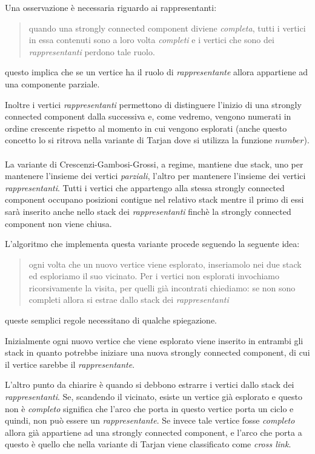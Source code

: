 Una osservazione \`e necessaria riguardo ai rappresentanti:
\begin{quotation}
  quando una strongly connected component diviene \emph{completa},
  tutti i vertici in essa contenuti sono a loro volta \emph{completi}
  e i vertici che sono dei \emph{rappresentanti} perdono tale ruolo.
\end{quotation}
questo implica che se un vertice ha il ruolo di \emph{rappresentante}
allora appartiene ad una componente parziale. 

Inoltre i vertici \emph{rappresentanti} permettono di distinguere
l'inizio di una strongly connected component dalla successiva e, come
vedremo, vengono numerati in ordine crescente rispetto al momento in
cui vengono esplorati (anche questo concetto lo si ritrova nella
variante di Tarjan dove si utilizza la funzione $number$).
\\\\
La variante di Crescenzi-Gambosi-Grossi, a regime, mantiene due stack,
uno per mantenere l'insieme dei vertici \emph{parziali}, l'altro per
mantenere l'insieme dei vertici \emph{rappresentanti}. Tutti i vertici
che appartengo alla stessa strongly connected component occupano
posizioni contigue nel relativo stack mentre il primo di essi sar\`a
inserito anche nello stack dei \emph{rappresentanti} finch\`e la
strongly connected component non viene chiusa.

L'algoritmo che implementa questa variante procede seguendo la
seguente idea:
\begin{quotation}
  ogni volta che un nuovo vertice viene esplorato, inseriamolo nei due
  stack ed esploriamo il suo vicinato. Per i vertici non esplorati
  invochiamo ricorsivamente la visita, per quelli gi\`a incontrati
  chiediamo: se non sono completi allora si estrae dallo stack dei
  \emph{rappresentanti}
\end{quotation}
queste semplici regole necessitano di qualche
spiegazione. 

Inizialmente ogni nuovo vertice che viene esplorato viene
inserito in entrambi gli stack in quanto potrebbe iniziare una nuova
strongly connected component, di cui il vertice sarebbe il
\emph{rappresentante}. 

L'altro punto da chiarire \`e quando si debbono estrarre i vertici
dallo stack dei \emph{rappresentanti}. Se, scandendo il vicinato,
esiste un vertice gi\`a esplorato e questo non \`e \emph{completo}
significa che l'arco che porta in questo vertice porta un ciclo e
quindi, non pu\`o essere un \emph{rappresentante}. Se invece tale
vertice fosse \emph{completo} allora gi\`a appartiene ad una strongly
connected component, e l'arco che porta a questo \`e quello che nella
variante di Tarjan viene classificato come \emph{cross link}.

